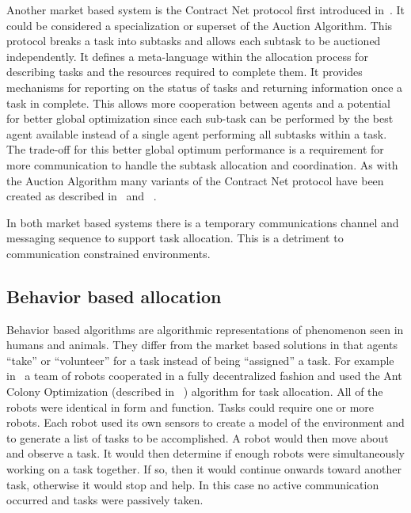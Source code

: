 Another market based system is the Contract Net protocol first introduced in~\cite{contract_net}.  It could be considered a specialization or superset of the Auction Algorithm.  This protocol breaks a task into subtasks and allows each subtask to be auctioned independently. It defines a meta-language within the allocation process for describing tasks and the resources required to complete them.  It provides mechanisms for reporting on the status of tasks and returning information once a task in complete.  This allows more cooperation between agents and a potential for better global optimization since each sub-task can be performed by the best agent available instead of a single agent performing all subtasks within a task.  The trade-off for this better global optimum performance is a requirement for more communication to handle the subtask allocation and coordination.  As with the Auction Algorithm many variants of the Contract Net protocol have been created as described in~\cite{contract_survey} and ~\cite{contract_equity}.

In both market based systems there is a temporary communications channel and messaging sequence to support task allocation.  This is a detriment to communication constrained environments.

\subsection{Behavior based allocation}

Behavior based algorithms are algorithmic representations of phenomenon seen in humans and animals. They differ from the market based solutions in that agents ``take'' or ``volunteer'' for a task instead of being ``assigned'' a task.  For example in~\cite{ant_colony_opt} a team of robots cooperated in a fully decentralized fashion and used the Ant Colony Optimization (described in ~\cite{wiki:aco}) algorithm for task allocation.  All of the robots were identical in form and function.  Tasks could require one or more robots.  Each robot used its own sensors to create a model of the environment and to generate a list of tasks to be accomplished.  A robot would then move about and observe a task.  It would then determine if enough robots were simultaneously working on a task together.  If so, then it would continue onwards toward another task, otherwise it would stop and help.  In this case no active communication occurred and tasks were passively taken.

